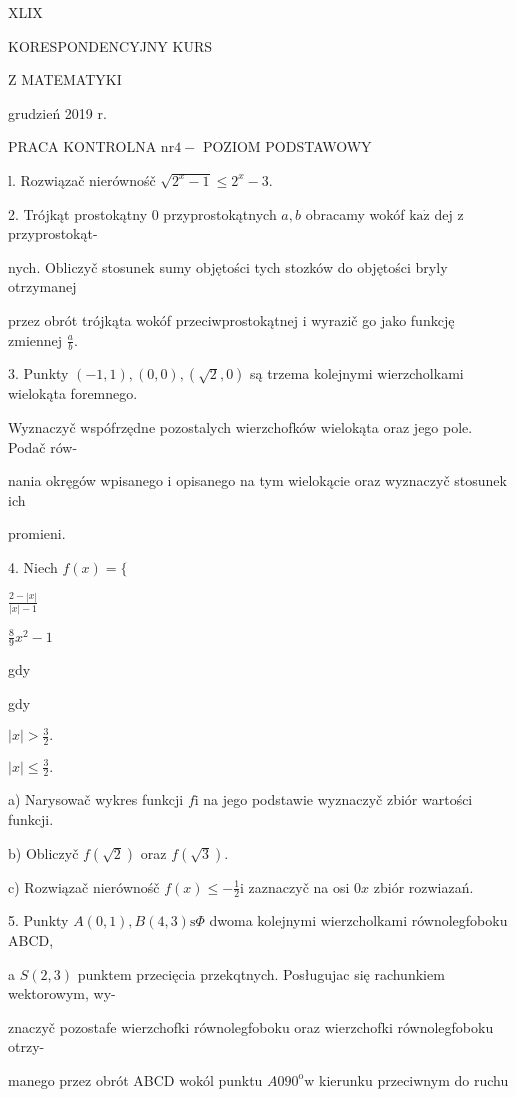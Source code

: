 \documentclass[a4paper,12pt]{article}
\begin{document}
XLIX

KORESPONDENCYJNY KURS

Z MATEMATYKI

grudzień 2019 r.

PRACA KONTROLNA $\mathrm{n}\mathrm{r} 4-$ POZIOM PODSTAWOWY

l. Rozwiązač nierównośč $\sqrt{2^{x}-1}\leq 2^{x}-3.$

2. Trójkąt prostokątny $0$ przyprostokątnych $a, b$ obracamy wokóf $\mathrm{k}\mathrm{a}\dot{\mathrm{z}}$ dej $\mathrm{z}$ przyprostokąt-

nych. Obliczyč stosunek sumy objętości tych stozków do objętości bryly otrzymanej

przez obrót trójkąta wokóf przeciwprostokątnej $\mathrm{i}$ wyrazič go jako funkcję zmiennej $\displaystyle \frac{a}{b}.$

3. Punkty $(-1,1), (0,0), (\sqrt{2},0)$ są trzema kolejnymi wierzcholkami wielokąta foremnego.

Wyznaczyč wspófrzędne pozostalych wierzchofków wielokąta oraz jego pole. Podač rów-

nania okręgów wpisanego $\mathrm{i}$ opisanego na tym wielokącie oraz wyznaczyč stosunek ich

promieni.

4. Niech $f(x)=\{$

$\displaystyle \frac{2-|x|}{|x|-1}$

$\displaystyle \frac{8}{9}x^{2}-1$

gdy

gdy

$|x|>\displaystyle \frac{3}{2}.$

$|x|\displaystyle \leq\frac{3}{2}.$

a) Narysowač wykres funkcji $f\mathrm{i}$ na jego podstawie wyznaczyč zbiór wartości funkcji.

b) Obliczyč $f(\sqrt{2})$ oraz $f(\sqrt{3}).$

c) Rozwiązač nierównośč $f(x)\displaystyle \leq-\frac{1}{2}\mathrm{i}$ zaznaczyč na osi $0x$ zbiór rozwiazań.

5. Punkty $A(0,1), B(4,3) \mathrm{s}\Phi$ dwoma kolejnymi wierzcholkami równolegfoboku ABCD,

a $S(2,3)$ punktem przecięcia przekqtnych. Posługujac się rachunkiem wektorowym, wy-

znaczyč pozostafe wierzchofki równolegfoboku oraz wierzchofki równolegfoboku otrzy-

manego przez obrót ABCD wokól punktu $A090^{\mathrm{o}} \mathrm{w}$ kierunku przeciwnym do ruchu
\end{document}
